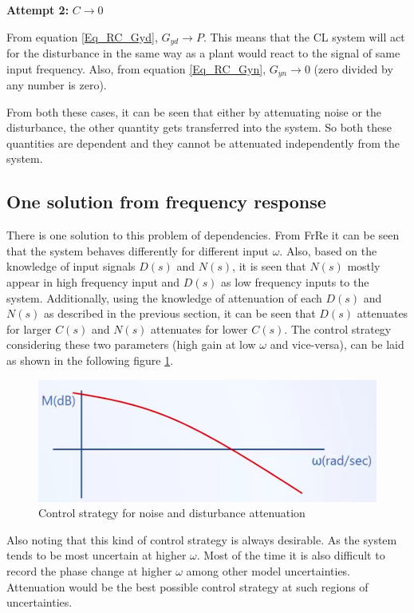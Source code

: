 \textbf{Attempt 2: }$C \rightarrow 0$

From equation \eqref{Eq_RC_Gyd}, $G_{yd} \rightarrow P$. This means that the CL system will act for the disturbance in the same way as a plant would react to the signal of same input frequency. Also, from equation \eqref{Eq_RC_Gyn}, $G_{yn} \rightarrow 0$ (zero divided by any number is zero). 

From both these cases, it can be seen that either by attenuating noise or the disturbance, the other quantity gets transferred into the system. So both these quantities are dependent and they cannot be attenuated independently from the system.

\subsection{One solution from frequency response}

There is one solution to this problem of dependencies. From FrRe it can be seen that the system behaves differently for different input $\omega$. Also, based on the knowledge of input signals $D(s)$ and $N(s)$, it is seen that $N(s)$ mostly appear in high frequency input and $D(s)$ as low frequency inputs to the system. Additionally, using the knowledge of attenuation of each $D(s)$ and $N(s)$ as described in the previous section, it can be seen that $D(s)$ attenuates for larger $C(s)$ and $N(s)$ attenuates for lower $C(s)$. The control strategy considering these two parameters (high gain at low $\omega$ and vice-versa), can be laid as shown in the following figure \ref{Fig_RC_ControlStr}.
\begin{figure}[h!]
	\centering
	\includegraphics[width=0.8\linewidth]{Bilder/RC_ControlStr}
	\caption{Control strategy for noise and disturbance attenuation}
	\label{Fig_RC_ControlStr}
\end{figure}

Also noting that this kind of control strategy is always desirable. As the system tends to be most uncertain at higher $\omega$. Most of the time it is also difficult to record the phase change at higher $\omega$ among other model uncertainties. Attenuation would be the best possible control strategy at such regions of uncertainties.


